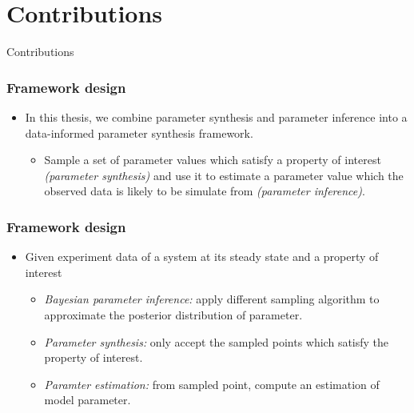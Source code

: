 \documentclass{beamer}
\begin{document}
\section{Contributions}
\begin{frame}
    \begin{center}
        \Huge Contributions
    \end{center}
\end{frame}

\begin{frame}
    \frametitle{Framework design}
    \begin{itemize}
        \item In this thesis, we combine parameter synthesis and parameter inference into a
              data-informed parameter synthesis framework.
              \begin{itemize}
                  \item Sample a set of parameter values which satisfy a property of interest
                        \textit{(parameter synthesis)} and use it to estimate a parameter value which
                        the observed data is likely to be simulate from \textit{(parameter inference)}.
              \end{itemize}
    \end{itemize}
\end{frame}

\begin{frame}
    \frametitle{Framework design}
    \begin{itemize}
        \item Given experiment data of a system at its steady state and a property of interest
              \begin{itemize}
                  \item \textit{Bayesian parameter inference:} apply different sampling algorithm to
                        approximate the posterior distribution of parameter.
                  \item \textit{Parameter synthesis:} only accept the sampled points which satisfy
                        the property of interest.
                  \item \textit{Paramter estimation:} from sampled point, compute an estimation of
                        model parameter.
              \end{itemize}
    \end{itemize}
\end{frame}
\end{document}
